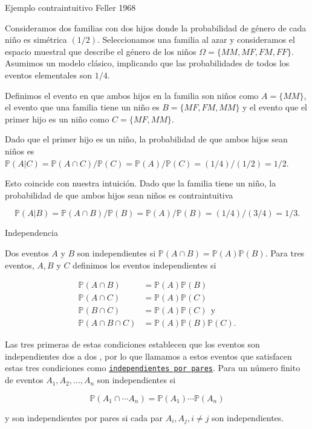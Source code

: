 \documentclass[10pt]{beamer}
\begin{document}
\begin{frame}{Ejemplo contraintuitivo Feller 1968}
\small{Consideramos dos familias con dos hijos donde la probabilidad de g\'enero de cada ni\~no es sim\'etrica $(1/2)$. Seleccionamos una familia al azar y consideramos el espacio muestral que describe el g\'enero de los ni\~nos $\Omega=\{MM,MF,FM,FF\}$. Asumimos un modelo cl\'asico, implicando que las probabilidades de  todos los eventos elementales son $1/4$.
	
		
\vspace{0.2cm}	
		
Definimos el evento  en que ambos hijos en la familia son ni\~nos como $A=\{MM\}$, el evento que una familia tiene un ni\~no es $B=\{MF,FM,MM\}$ y el evento que el primer hijo es un ni\~no como $C=\{MF,MM\}$.
		
		
Dado que el primer hijo  es un ni\~no, la probabilidad de que ambos hijos sean ni\~nos es $\mathbb{P}(A | C)=\mathbb{P}(A\cap C)/\mathbb{P}(C)=\mathbb{P}(A)/\mathbb{P}(C)=(1/4)/(1/2)=1/2.$
		
		
\vspace{0.2cm}
		
Esto coincide con nuestra intuici\'on. Dado que la familia tiene un ni\~no, la probabilidad de que ambos hijos sean ni\~nos es contraintuitiva}
		
\[
\mathbb{P}(A| B)=\mathbb{P}(A\cap B)/\mathbb{P}(B)=\mathbb{P}(A)/\mathbb{P}(B)=(1/4)/(3/4)=1/3.
\]
\end{frame}


\begin{frame}{Independencia}

\small{Dos eventos  $A$ y $B$ son independientes si  $\mathbb{P}(A\cap B) = \mathbb{P}(A)\mathbb{P}(B)$.  Para tres eventos, $A, B$ y $C$ definimos los eventos independientes si
	
	\begin{align*}
	\mathbb{P}(A \cap B) &= \mathbb{P}(A)\mathbb{P}(B)\\
	\mathbb{P}(A \cap C) &= \mathbb{P}(A)\mathbb{P}(C)\\
	\mathbb{P}(B \cap C) &= \mathbb{P}(A)\mathbb{P}(C)\ \ \text{y} \\
	\mathbb{P}(A \cap B \cap C) &= \mathbb{P}(A)\mathbb{P}(B)\mathbb{P}(C).
	\end{align*}
	
	
Las tres primeras de estas condiciones establecen que los eventos son independientes dos a dos , por lo que llamamos a estos eventos que satisfacen estas tres condiciones como \underline{\texttt{independientes por pares}}. Para un n\'umero finito de eventos $A_1, A_2, \dots, A_n$ son independientes si
	
\[
\mathbb{P}(A_1\cap\cdots A_n)=\mathbb{P}(A_1)\cdots \mathbb{P}(A_n)
\]
	
y son independientes por pares si cada par $A_i, A_j,  i \neq j$ son independientes.}
\end{frame}
\end{document}
